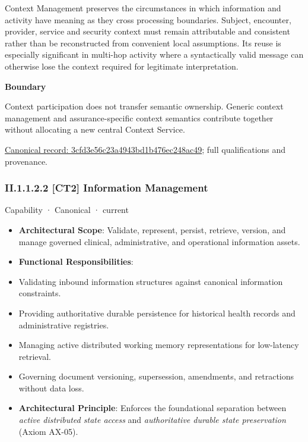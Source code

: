 Context Management preserves the circumstances in which information and activity have meaning as they cross processing boundaries. Subject, encounter, provider, service and security context must remain attributable and consistent rather than be reconstructed from convenient local assumptions. Its reuse is especially significant in multi-hop activity where a syntactically valid message can otherwise lose the context required for legitimate interpretation.



\textbf{Boundary}



Context participation does not transfer semantic ownership. Generic context management and assurance-specific context semantics contribute together without allocating a new central Context Service.


{\footnotesize \href{../../../../continuum/strategy/capability/3cfd3e56c23a4943bd1b476ec248ac49.md}{Canonical record: 3cfd3e56c23a4943bd1b476ec248ac49}; full qualifications and provenance.}\par
\subsubsection*{II.1.1.2.2 [CT2] Information Management}
\label{navigation:II.1.1.2.2}

\label{element:43051efd406b4040bff8e794b7a631e0}
{\small Capability · Canonical · current}\par

\begin{itemize}


\item \textbf{Architectural Scope}: Validate, represent, persist, retrieve, version, and manage governed clinical, administrative, and operational information assets.

\item \textbf{Functional Responsibilities}:

\item Validating inbound information structures against canonical information constraints.

\item Providing authoritative durable persistence for historical health records and administrative registries.

\item Managing active distributed working memory representations for low-latency retrieval.

\item Governing document versioning, supersession, amendments, and retractions without data loss.

\item \textbf{Architectural Principle}: Enforces the foundational separation between \emph{active distributed state access} and \emph{authoritative durable state preservation} (Axiom AX-05).

\end{itemize}



